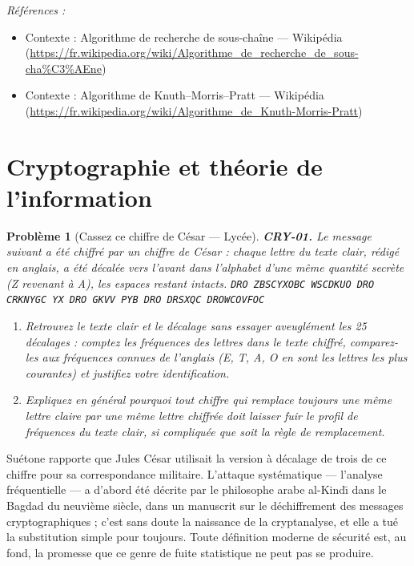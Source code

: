 \documentclass[11pt]{article}
\newtheorem{problem}{Problème}
\newenvironment{refs}{\par\small\noindent\emph{Références :}\begin{itemize}\setlength\itemsep{0pt}}{\end{itemize}\normalsize}
\begin{document}
\begin{refs}
\item Contexte : Algorithme de recherche de sous-chaîne --- Wikipédia (\url{https://fr.wikipedia.org/wiki/Algorithme_de_recherche_de_sous-cha%C3%AEne})
\item Contexte : Algorithme de Knuth--Morris--Pratt --- Wikipédia (\url{https://fr.wikipedia.org/wiki/Algorithme_de_Knuth-Morris-Pratt})
\end{refs}

\bigskip


\section*{Cryptographie et théorie de l'information}

\begin{problem}[{Cassez ce chiffre de César --- Lycée}]
\textbf{CRY-01.} Le message suivant a été chiffré par un chiffre
de César : chaque lettre du texte clair, rédigé en anglais, a été décalée vers l'avant dans
l'alphabet d'une même quantité secrète (Z revenant à A), les espaces restant intacts.
 \texttt{DRO ZBSCYXOBC WSCDKUO DRO CRKNYGC YX DRO GKVV PYB DRO DRSXQC
DROWCOVFOC}
\begin{enumerate}
\item[(a)] Retrouvez le texte clair et le décalage \textit{sans essayer aveuglément les 25 décalages} :
comptez les fréquences des lettres dans le texte chiffré, comparez-les aux fréquences
connues de l'anglais (E, T, A, O en sont les lettres les plus courantes) et justifiez votre
identification.
\item[(b)] Expliquez en général pourquoi tout chiffre qui remplace toujours une même lettre claire
par une même lettre chiffrée doit laisser fuir le profil de fréquences du texte clair, si
compliquée que soit la règle de remplacement.
\end{enumerate}

\end{problem}

\noindent Suétone rapporte que Jules César utilisait la version à décalage de trois
de ce chiffre pour sa correspondance militaire. L'attaque systématique --- l'analyse
fréquentielle --- a d'abord été décrite par le philosophe arabe al-Kind\={\i} dans le Bagdad du
neuvième siècle, dans un manuscrit sur le déchiffrement des messages cryptographiques ;
c'est sans doute la naissance de la cryptanalyse, et elle a tué la substitution simple pour
toujours. Toute définition moderne de sécurité est, au fond, la promesse que ce genre de
fuite statistique ne peut pas se produire.
\end{document}
